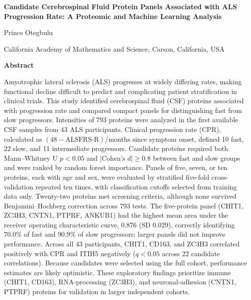 \documentclass[11pt,letterpaper]{article}
\begin{document}
\begin{titlepage}
\centering
\vspace*{1.5in}
{\Large\bfseries Candidate Cerebrospinal Fluid Protein Panels Associated with ALS Progression Rate: A Proteomic and Machine Learning Analysis\par}
\vspace{0.4in}
{\large Prince Otegbulu\par}
\vspace{0.05in}
{\small California Academy of Mathematics and Science, Carson, California, USA\par}
\vspace{0.6in}

\begin{minipage}{0.9\textwidth}
{\centering\textbf{Abstract}\par}\vspace{6pt}
\setlength{\parindent}{1.5em}
\small
\indent Amyotrophic lateral sclerosis (ALS) progresses at widely differing rates, making functional decline difficult to predict and complicating patient stratification in clinical trials. This study identified cerebrospinal fluid (CSF) proteins associated with progression rate and compared compact panels for distinguishing fast from slow progressors. Intensities of 793 proteins were analyzed in the first available CSF samples from 43 ALS participants. Clinical progression rate (CPR), calculated as $(48 - \text{ALSFRS-R})/\text{months since symptom onset}$, defined 10 fast, 22 slow, and 11 intermediate progressors. Candidate proteins required both Mann--Whitney U $p < 0.05$ and $|\text{Cohen's } d| \geq 0.8$ between fast and slow groups and were ranked by random forest importance. Panels of five, seven, or ten proteins, each with age and sex, were evaluated by stratified five-fold cross-validation repeated ten times, with classification cutoffs selected from training data only. Twenty-two proteins met screening criteria, although none survived Benjamini--Hochberg correction across 793 tests. The five-protein panel (CHIT1, ZC3H3, CNTN1, PTPRF, ANKUB1) had the highest mean area under the receiver operating characteristic curve, 0.876 (SD 0.029), correctly identifying 70.0\% of fast and 90.9\% of slow progressors; larger panels did not improve performance. Across all 43 participants, CHIT1, CD163, and ZC3H3 correlated positively with CPR and ITIH5 negatively ($q < 0.05$ across 22 candidate correlations). Because candidates were selected using the full cohort, performance estimates are likely optimistic. These exploratory findings prioritize immune (CHIT1, CD163), RNA-processing (ZC3H3), and neuronal-adhesion (CNTN1, PTPRF) proteins for validation in larger independent cohorts.
\end{minipage}
\end{titlepage}
\end{document}
